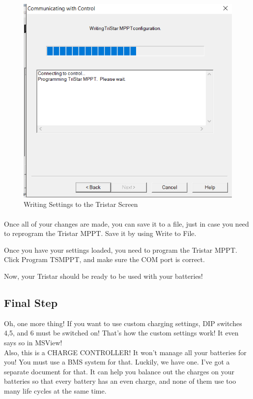 \begin{figure}[!htb]
	\includegraphics[width=\textwidth,height=\textwidth]{./graphics/tsmppt_troubleshooting/ms_19.png}
	\caption{\label{fig:settings-14} Writing Settings to the Tristar Screen}
\end{figure}

\paragraph{}
Once all of your changes are made, you can save it to a file, just in case you need to reprogram the Tristar MPPT. Save it by using Write to File.

Once you have your settings loaded, you need to program the Tristar MPPT. Click Program TSMPPT, and make sure the COM port is correct.

Now, your Tristar should be ready to be used with your batteries!

\subsection{Final Step}
Oh, one more thing! If you want to use custom charging settings, DIP switches 4,5, and 6 must be switched on! That’s how the custom settings work! It even says so in MSView! \\
Also, this is a CHARGE CONTROLLER! It won’t manage all your batteries for you! You must use a BMS system for that. Luckily, we have one. I’ve got a separate document for that. It can help you balance out the charges on your batteries so that every battery has an even charge, and none of them use too many life cycles at the same time.
 \\


